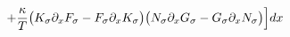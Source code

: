 \documentclass[preview]{standalone}
\newcommand{\dx}{\partial_x}
\begin{document}
\begin{align*}
\special{dvisvgm:raw <g id='unique000'>}\qquad+\frac{\kappa}{T}\big(K_\sigma\dx F_\sigma-F_\sigma\dx K_\sigma\big)\big(N_\sigma\dx G_\sigma-G_\sigma\dx N_\sigma\big)\Big]dx\special{dvisvgm:raw </g>}
\end{align*}
\end{document}

